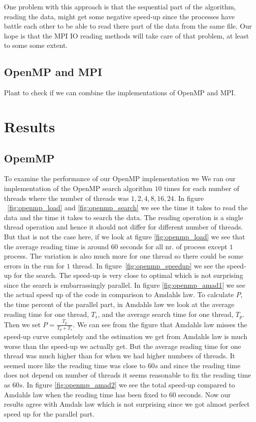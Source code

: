\documentclass[a4paper,10pt]{article}
\begin{document}
  One problem with this approach is that the sequential part of the algorithm, reading the data,
  might get some negative speed-up since the processes have battle each other 
  to be able to read there part of the data from the same file.  Our hope is that
  the MPI IO reading methods will take care of that problem, at least to some some extent.   
  

\subsection{OpenMP and MPI}
  Plant to check if we can combine the implementations of OpenMP and MPI.



\section{Results}

\subsection{OpemMP}
 
 To examine the performance of our OpenMP implementation we 
 We ran our implementation of the OpenMP search algorithm $10$ times for each number
 of threads where the number of threads was $1,2,4,8,16,24$.
 In figure ~\ref{fig:openmp_load} and \ref{fig:openmp_search} we see the
 time it takes to read the data and the time it takes to search the data.
 The reading operation is a single thread operation and hence it should not differ for 
 different number of threads.  But that is not the case here, if we look at figure \ref{fig:openmp_load}
 we see that the average reading time is around $60$ seconds for all nr. of process except
 $1$ process.  The variation is also much more for one thread so there could be some 
 errors in the run for $1$ thread. 
 In figure~\ref{fig:openmp_speedup} we see the speed-up for the search. 
 The speed-up is very close to optimal which is not surprising since the search is embarrassingly
 parallel.
 In figure \ref{fig:openmp_amad1} we see the actual speed up of the code in comparison to Amdahls law.
 To calculate $P$, the time percent of the parallel part, in Amdahls law we look at the
 average reading time for one thread, $T_s$, and the average search time for one thread, $T_p$.
 Then we set $P=\frac{T_p}{T_p+T_s}$.  We can see from the figure that Amdahls law misses the speed-up 
 curve completely and the estimation we get from Amdahls law
 is much worse than the speed-up we actually get.
 But the average reading time for one thread was much higher than for when we had higher numbers of 
 threads.  It seemed more like the reading time was close to $60s$ and since the reading
 time does not depend on number of threads it seems reasonable to fix the reading time as $60s$.
 In figure \ref{fig:openmp_amad2} we see the total speed-up compared to Amdahls law
 when the reading time has been fixed to $60$ seconds.  Now our results agree with Amdals law
 which is not surprising since we got almost perfect speed up for the parallel part.
\end{document}
